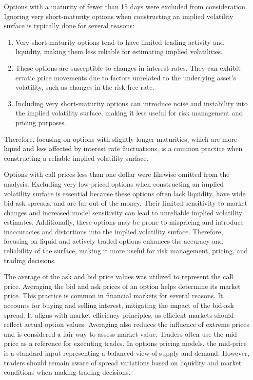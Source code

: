 Options with a maturity of fewer than 15 days were excluded from consideration. Ignoring very short-maturity options when constructing an implied volatility surface is typically done for several reasons:
\begin{enumerate}
    \item Very short-maturity options tend to have limited trading activity and liquidity, making them less reliable for estimating implied volatilities.
    \item These options are susceptible to changes in interest rates. They can exhibit erratic price movements due to factors unrelated to the underlying asset's volatility, such as changes in the risk-free rate.
    \item Including very short-maturity options can introduce noise and instability into the implied volatility surface, making it less useful for risk management and pricing purposes.
\end{enumerate}
Therefore, focusing on options with slightly longer maturities, which are more liquid and less affected by interest rate fluctuations, is a common practice when constructing a reliable implied volatility surface.

Options with call prices less than one dollar were likewise omitted from the analysis. Excluding very low-priced options when constructing an implied volatility surface is essential because these options often lack liquidity, have wide bid-ask spreads, and are far out of the money. Their limited sensitivity to market changes and increased model sensitivity can lead to unreliable implied volatility estimates. Additionally, these options may be prone to mispricing and introduce inaccuracies and distortions into the implied volatility surface. Therefore, focusing on liquid and actively traded options enhances the accuracy and reliability of the surface, making it more useful for risk management, pricing, and trading decisions.

The average of the ask and bid price values was utilized to represent the call price. Averaging the bid and ask prices of an option helps determine its market price. This practice is common in financial markets for several reasons. It accounts for buying and selling interest, mitigating the impact of the bid-ask spread. It aligns with market efficiency principles, as efficient markets should reflect actual option values. Averaging also reduces the influence of extreme prices and is considered a fair way to assess market value. Traders often use the mid-price as a reference for executing trades. In options pricing models, the mid-price is a standard input representing a balanced view of supply and demand. However, traders should remain aware of spread variations based on liquidity and market conditions when making trading decisions.

